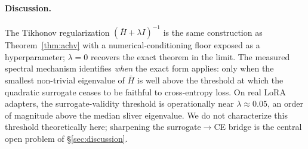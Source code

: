 \paragraph{Discussion.} The Tikhonov regularization
$(\bar H + \lambda I)^{-1}$ is the same construction as
Theorem~\ref{thm:achv} with a numerical-conditioning floor
exposed as a hyperparameter; $\lambda = 0$ recovers the exact
theorem in the limit. The measured spectral mechanism identifies
\emph{when} the exact form applies: only when the smallest
non-trivial eigenvalue of $\bar H$ is well above the threshold at
which the quadratic surrogate ceases to be faithful to
cross-entropy loss. On real LoRA adapters, the surrogate-validity
threshold is operationally near $\lambda \approx 0.05$, an order of
magnitude above the median sliver eigenvalue. We do not characterize
this threshold theoretically here; sharpening the surrogate$\to$CE
bridge is the central open problem of \S\ref{sec:discussion}.

